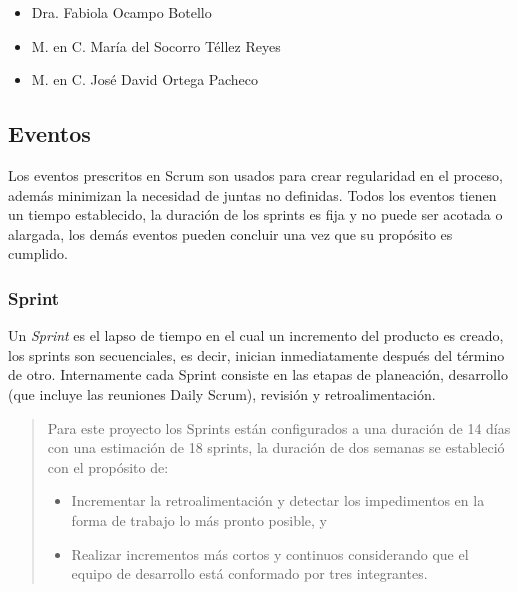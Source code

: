     \begin{itemize}
        \item Dra. Fabiola Ocampo Botello
        \item M. en C. María del Socorro Téllez Reyes
        \item M. en C. José David Ortega Pacheco
    \end{itemize}

\subsection{Eventos}

 Los eventos prescritos en Scrum son usados para crear regularidad en el proceso, además
 minimizan la necesidad de juntas no definidas. Todos los eventos tienen un tiempo establecido, 
 la duración de los sprints es fija y no puede ser acotada o alargada, los demás eventos pueden
 concluir una vez que su propósito es cumplido.

\subsubsection{Sprint}

 Un {\it Sprint} es el lapso de tiempo en el cual un incremento del producto es creado, los sprints
 son secuenciales, es decir, inician inmediatamente después del término de otro. Internamente 
 cada Sprint consiste en las etapas de planeación, desarrollo (que incluye las reuniones Daily Scrum),
 revisión y retroalimentación.
    
    

 \begin{quote}
    \noindent Para este proyecto los Sprints están configurados a una duración de 14 días con una
    estimación de 18 sprints, la duración de dos semanas se estableció con el propósito de:
    
    \begin{itemize}
        \item Incrementar la retroalimentación y detectar los impedimentos
              en la forma de trabajo lo más pronto posible, y

        \item Realizar incrementos más cortos y continuos considerando que el
              equipo de desarrollo está conformado por tres integrantes.
    \end{itemize} 
 \end{quote}
    
